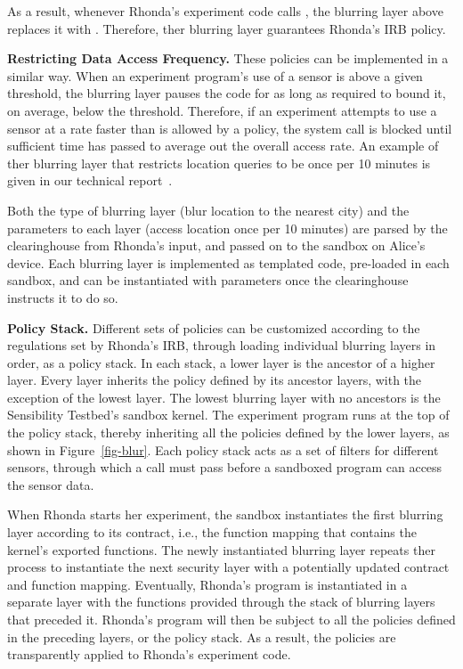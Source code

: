 As a result, whenever Rhonda's experiment code calls , 
the blurring layer above replaces it with . Therefore,
ther blurring layer guarantees Rhonda's IRB policy.

\textbf{Restricting Data Access Frequency.}
These policies can be implemented in a similar way. When an experiment 
program's use of a sensor is above a given threshold, the blurring layer 
pauses the code for as long as required to bound it, on average, below 
the threshold. Therefore, if an experiment attempts to use a sensor at a 
rate faster than is allowed by a policy, the system call is blocked until 
sufficient time has passed to average out the overall access rate. An example
of ther blurring layer that restricts location queries to be once per 10 minutes
is given in our technical report~\cite{zhuangTR15}.

Both the type of blurring layer (blur location to the nearest city) and the 
parameters to each layer (access location once per 10 minutes) are parsed
by the clearinghouse from Rhonda's input, and passed on to the sandbox on 
Alice's device. Each blurring layer is implemented as templated code, 
pre-loaded in each sandbox, and can be instantiated with parameters 
once the clearinghouse instructs it to do so.

\textbf{Policy Stack.}
Different sets of policies can be customized 
according to the regulations set by Rhonda's IRB, through loading 
individual blurring layers in order, as a policy stack. In each stack, 
a lower layer is the ancestor of a higher layer. Every layer inherits 
the policy defined by its ancestor layers, with the exception of the lowest layer. 
The lowest blurring layer with no ancestors is the 
Sensibility Testbed's sandbox kernel. The experiment program runs at the top 
of the policy stack, thereby inheriting all the policies defined by the
lower layers, as shown in Figure~\ref{fig-blur}. 
Each policy stack acts as a set of filters for different sensors, through 
which a call must pass before a sandboxed program can
access the sensor data. 

When Rhonda starts her experiment, the sandbox %
instantiates the first blurring layer according to its contract, i.e., the function 
mapping that contains the kernel's exported functions.
The newly instantiated blurring layer repeats ther process 
to instantiate the next security layer with a potentially updated contract and 
function mapping. Eventually, Rhonda's program is instantiated
in a separate layer with the functions provided
through the stack of blurring layers that preceded it.
Rhonda's program will then be subject to all the 
policies defined in the preceding layers, or the policy stack. 
As a result,  the policies are transparently applied to Rhonda's experiment code. 

